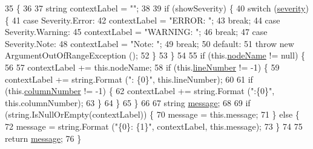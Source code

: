 \begin{DoxyCode}
35         \{
36 
37             \textcolor{keywordtype}{string} contextLabel = \textcolor{stringliteral}{""};
38 
39             \textcolor{keywordflow}{if} (showSeverity) \{
40                 \textcolor{keywordflow}{switch} (\hyperlink{a00035_ad90ffa839ce0f568a099bb37b4a6c4da}{severity}) \{
41                 \textcolor{keywordflow}{case} Severity.Error:
42                     contextLabel = \textcolor{stringliteral}{"ERROR: "};
43                     \textcolor{keywordflow}{break};
44                 \textcolor{keywordflow}{case} Severity.Warning:
45                     contextLabel = \textcolor{stringliteral}{"WARNING: "};
46                     \textcolor{keywordflow}{break};
47                 \textcolor{keywordflow}{case} Severity.Note:
48                     contextLabel = \textcolor{stringliteral}{"Note: "};
49                     \textcolor{keywordflow}{break};
50                 \textcolor{keywordflow}{default}:
51                     \textcolor{keywordflow}{throw} \textcolor{keyword}{new} ArgumentOutOfRangeException ();
52                 \}
53             \}
54 
55             \textcolor{keywordflow}{if} (this.\hyperlink{a00035_a662aca4ad2af5116c2cf6773daf1a847}{nodeName} != null) \{
56 
57                 contextLabel += this.nodeName;
58                 \textcolor{keywordflow}{if} (this.\hyperlink{a00035_a0bd73f1c684bfd66ae7b6bef8f2972d0}{lineNumber} != -1) \{
59                     contextLabel += string.Format (\textcolor{stringliteral}{": \{0\}"}, this.lineNumber);
60 
61                     \textcolor{keywordflow}{if} (this.\hyperlink{a00035_a658e7fb05555c0f9ab5f80057bdc1408}{columnNumber} != -1) \{
62                         contextLabel += string.Format (\textcolor{stringliteral}{":\{0\}"}, this.columnNumber);
63                     \}
64                 \}
65             \} 
66 
67             \textcolor{keywordtype}{string} \hyperlink{a00035_ac7ed070dddd2613c08e7874ea5afb3af}{message};
68 
69             \textcolor{keywordflow}{if} (\textcolor{keywordtype}{string}.IsNullOrEmpty(contextLabel)) \{
70                 message = this.message;
71             \} \textcolor{keywordflow}{else} \{
72                 message = string.Format (\textcolor{stringliteral}{"\{0\}: \{1\}"}, contextLabel, this.message);
73             \}
74 
75             \textcolor{keywordflow}{return} \hyperlink{a00035_ac7ed070dddd2613c08e7874ea5afb3af}{message};
76         \}
\end{DoxyCode}


